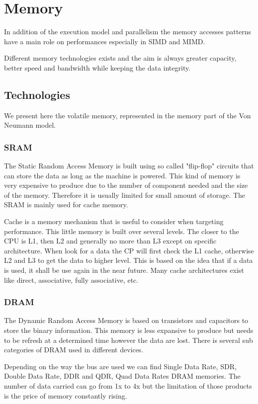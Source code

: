 \section{Memory}
In addition of the execution model and parallelism the memory accesses patterns have a main role on performances especially in SIMD and MIMD. 

Different memory technologies exists and the aim is always greater capacity, better speed and bandwidth while keeping the data integrity.

\subsection{Technologies}
We present here the volatile memory, represented in the memory part of the Von Neumann model. 

\subsubsection{SRAM}
The Static Random Access Memory is built using so called "flip-flop" circuits that can store the data as long as the machine is powered. 
This kind of memory is very expensive to produce due to the number of component needed and the size of the memory.
Therefore it is usually limited for small amount of storage. 
The SRAM is mainly used for cache memory. 

Cache is a memory mechanism that is useful to consider when targeting performance. 
This little memory is built over several levels. 
The closer to the CPU is L1, then L2 and generally no more than L3 except on specific architecture. 
When look for a data the CP will first check the L1 cache, otherwise L2 and L3 to get the data to higher level. 
This is based on the idea that if a data is used, it shall be use again in the near future.
Many cache architectures exist like direct, associative, fully associative, etc. 

\subsubsection{DRAM}
The Dynamic Random Access Memory is based on transistors and capacitors to store the binary information.
This memory is less expansive to produce but needs to be refresh at a determined time however the data are lost. 
There is several sub categories of DRAM used in different devices. 

Depending on the way the bus are used we can find Single Data Rate, SDR, Double Data Rate, DDR and QDR, Quad Data Rates DRAM memories. 
The number of data carried can go from 1x to 4x but the limitation of those products is the price of memory constantly rising. 

